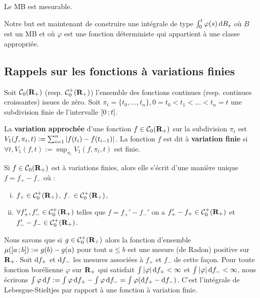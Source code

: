 	\begin{cor}
		Le MB est mesurable.
	\end{cor}

	Notre but est maintenant de construire une intégrale de type $\int_0^t \varphi(s) \mathop{}\mathopen{}\mathrm{d} B_s$ où $B$ est un MB et où $\varphi$ est une fonction déterministe qui appartient à une classe appropriée.


\subsection{Rappels sur les fonctions à variations finies}

	Soit $\mathcal{C}_0(\mathbf{R}_+)$ (resp. $\mathcal{C}_0^+(\mathbf{R}_+)$) l'ensemble des fonctions continues (resp. continues croissantes) issues de zéro.
	Soit $\pi_t = \{ t_0,\ldots,t_n \}, 0 = t_0 < t_1 < \ldots < t_n = t$ une subdivision finie de l'intervalle $\mathopen{}\mathclose{\left[0\mathclose{}\mathpunct{};t\right]}$.
	
	\begin{defn}
		La \textbf{variation approchée} d'une fonction $f \in \mathcal{C}_0(\mathbf{R}_+)$ sur la subdivision $\pi_t$ est $V_1(f,\pi_t,t) := \sum_{i = 1}^n \left\lvert f(t_i) - f(t_{i - 1})\right\rvert$.
		La fonction $f$ est dit à \textbf{variation finie} si $\forall t, V_1(f,t) := \sup_{\pi_t} V_1(f,\pi_t,t)$ est finie.
	\end{defn}
	
	\begin{pop}
		Si $f \in \mathcal{C}_0(\mathbf{R}_+)$ est à variations finies, alors elle s'écrit d'une manière unique $f = f_+ - f_-$ où :
		\begin{enumerate}[(i)]
			\item $f_+ \in \mathcal{C}_0^+(\mathbf{R}_+)$, $f_- \in \mathcal{C}_0^+(\mathbf{R}_+)$,
			\item $\forall f_+',f_-' \in \mathcal{C}_0^+(\mathbf{R}_+)$ telles que $f = f_+' - f_-'$ on a $f_+' - f_+ \in \mathcal{C}_0^+(\mathbf{R}_+)$ et $f_-' - f_- \in \mathcal{C}_0^+(\mathbf{R}_+)$.
		\end{enumerate}
	\end{pop}
	
	Nous savons que si $g \in \mathcal{C}_0^+(\mathbf{R}_+)$ alors la fonction d'ensemble $\mu(\mathopen{}\mathclose{\left]a\mathclose{}\mathpunct{};b\right]}) := g(b) - g(a)$ pour tout $a \leq b$ est une mesure (de Radon) positive sur $\mathbf{R}_+$.
	Soit $\mathop{}\mathopen{}\mathrm{d} f_+$ et $\mathop{}\mathopen{}\mathrm{d} f_-$ les mesures associées à $f_+$ et $f_-$ de cette façon.
	Pour toute fonction borélienne $\varphi$ sur $\mathbf{R}_+$ qui satisfait $\int \left\lvert\varphi\right\rvert \mathop{}\mathopen{}\mathrm{d} f_+ < \infty$ et $\int \left\lvert\varphi\right\rvert \mathop{}\mathopen{}\mathrm{d} f_- < \infty$, nous écrirons $\int \varphi \mathop{}\mathopen{}\mathrm{d} f := \int \varphi \mathop{}\mathopen{}\mathrm{d} f_+ - \int \varphi \mathop{}\mathopen{}\mathrm{d} f_- = \int \varphi (\mathop{}\mathopen{}\mathrm{d} f_+ - \mathop{}\mathopen{}\mathrm{d} f_-)$.
	C'est l'intégrale de Lebesgue-Stieltjes par rapport à une fonction à variation finie.


